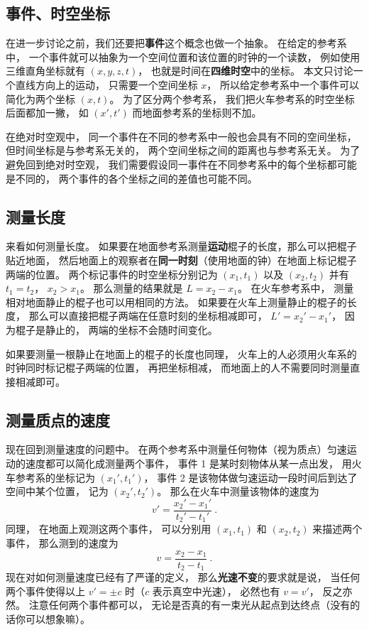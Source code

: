 \subsection{事件、时空坐标}
在进一步讨论之前，我们还要把\textbf{事件}这个概念也做一个抽象。 在给定的参考系中， 一个事件就可以抽象为一个空间位置和该位置的时钟的一个读数， 例如使用三维直角坐标就有 $(x, y, z, t)$， 也就是时间在\textbf{四维时空}中的坐标。 本文只讨论一个直线方向上的运动， 只需要一个空间坐标 $x$， 所以给定参考系中一个事件可以简化为两个坐标 $(x, t)$。 为了区分两个参考系， 我们把火车参考系的时空坐标后面都加一撇， 如 $(x', t')$ 而地面参考系的坐标则不加。

在绝对时空观中， 同一个事件在不同的参考系中一般也会具有不同的空间坐标， 但时间坐标是与参考系无关的， 两个空间坐标之间的距离也与参考系无关。 为了避免回到绝对时空观， 我们需要假设同一事件在不同参考系中的每个坐标都可能是不同的， 两个事件的各个坐标之间的差值也可能不同。

\subsection{测量长度}\label{sub_Relat0_3}
来看如何测量长度。 如果要在地面参考系测量\textbf{运动}棍子的长度，那么可以把棍子贴近地面， 然后地面上的观察者在\textbf{同一时刻}（使用地面的钟）在地面上标记棍子两端的位置。 两个标记事件的时空坐标分别记为 $(x_1, t_1)$ 以及 $(x_2, t_2)$ 并有 $t_1 = t_2$， $x_2 > x_1$。 那么测量的结果就是 $L = x_2 - x_1$。 在火车参考系中， 测量相对地面静止的棍子也可以用相同的方法。 如果要在火车上测量静止的棍子的长度， 那么可以直接把棍子两端在任意时刻的坐标相减即可， $L' = x_2' - x_1'$， 因为棍子是静止的， 两端的坐标不会随时间变化。

如果要测量一根静止在地面上的棍子的长度也同理， 火车上的人必须用火车系的时钟同时标记棍子两端的位置， 再把坐标相减， 而地面上的人不需要同时测量直接相减即可。

\subsection{测量质点的速度}
现在回到测量速度的问题中。 在两个参考系中测量任何物体（视为质点）匀速运动的速度都可以简化成测量两个事件， 事件 1 是某时刻物体从某一点出发， 用火车参考系的坐标记为 $(x_1', t_1')$， 事件 2 是该物体做匀速运动一段时间后到达了空间中某个位置， 记为 $(x_2', t_2')$。 那么在火车中测量该物体的速度为
\begin{equation} \label{eq_Relat0_2}
v' = \frac{x_2' - x_1'}{t_2' - t_1'}~.
\end{equation}
同理， 在地面上观测这两个事件， 可以分别用 $(x_1, t_1)$ 和 $(x_2, t_2)$ 来描述两个事件， 那么测到的速度为
\begin{equation} \label{eq_Relat0_1}
v = \frac{x_2 - x_1}{t_2 - t_1}~.
\end{equation}
现在对如何测量速度已经有了严谨的定义， 那么\textbf{光速不变}的要求就是说， 当任何两个事件使得以上 $v' = \pm c$ 时（$c$ 表示真空中光速）， 必然也有 $v = v'$， 反之亦然。 注意任何两个事件都可以， 无论是否真的有一束光从起点到达终点（没有的话你可以想象嘛）。

